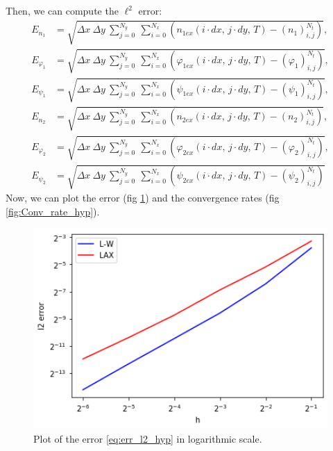 Then, we can compute the $\ell^{2}$ error:
\begin{align}
E_{n_{1}} & =\sqrt{\Delta x\:\Delta y\:\sum_{j=0}^{N_{y}}\:\sum_{i=0}^{N_{x}}\left(n_{1ex}\left(i\cdot dx,\,j\cdot dy,\,T\right)-\left(n_{1}\right)_{i,j}^{N_{t}}\right)},\label{eq:err_l2_hyp}\\
E_{\varphi_{1}} & =\sqrt{\Delta x\:\Delta y\:\sum_{j=0}^{N_{y}}\:\sum_{i=0}^{N_{x}}\left(\varphi_{1ex}\left(i\cdot dx,\,j\cdot dy,\,T\right)-\left(\varphi_{1}\right)_{i,j}^{N_{t}}\right)},\nonumber \\
E_{\psi_{1}} & =\sqrt{\Delta x\:\Delta y\:\sum_{j=0}^{N_{y}}\:\sum_{i=0}^{N_{x}}\left(\psi_{1ex}\left(i\cdot dx,\,j\cdot dy,\,T\right)-\left(\psi_{1}\right)_{i,j}^{N_{t}}\right)},\nonumber \\
E_{n_{2}} & =\sqrt{\Delta x\:\Delta y\:\sum_{j=0}^{N_{y}}\:\sum_{i=0}^{N_{x}}\left(n_{2ex}\left(i\cdot dx,\,j\cdot dy,\,T\right)-\left(n_{2}\right)_{i,j}^{N_{t}}\right)},\nonumber \\
E_{\varphi_{2}} & =\sqrt{\Delta x\:\Delta y\:\sum_{j=0}^{N_{y}}\:\sum_{i=0}^{N_{x}}\left(\varphi_{2ex}\left(i\cdot dx,\,j\cdot dy,\,T\right)-\left(\varphi_{2}\right)_{i,j}^{N_{t}}\right)},\nonumber \\
E_{\psi_{2}} & =\sqrt{\Delta x\:\Delta y\:\sum_{j=0}^{N_{y}}\:\sum_{i=0}^{N_{x}}\left(\psi_{2ex}\left(i\cdot dx,\,j\cdot dy,\,T\right)-\left(\psi_{2}\right)_{i,j}^{N_{t}}\right)}\nonumber 
\end{align}
 Now, we can plot the error (fig \ref{fig:Err_hyp}) and the convergence
rates (fig \ref{fig:Conv_rate_hyp}).

\begin{figure}[H]
\noindent \centering{}\includegraphics[width=1\textwidth]{immagini/validation_log-error_hyp}\caption{\foreignlanguage{english}{\label{fig:Err_hyp}Plot of the error \ref{eq:err_l2_hyp} in logarithmic
scale.}}
\end{figure}

